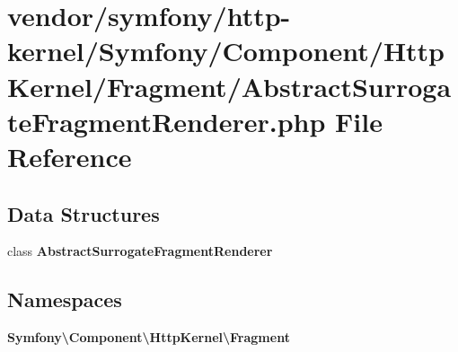 \section{vendor/symfony/http-\/kernel/\+Symfony/\+Component/\+Http\+Kernel/\+Fragment/\+Abstract\+Surrogate\+Fragment\+Renderer.php File Reference}
\label{_abstract_surrogate_fragment_renderer_8php}
\subsection*{Data Structures}
\begin{DoxyCompactItemize}
\item 
class {\bf Abstract\+Surrogate\+Fragment\+Renderer}
\end{DoxyCompactItemize}
\subsection*{Namespaces}
\begin{DoxyCompactItemize}
\item 
 {\bf Symfony\textbackslash{}\+Component\textbackslash{}\+Http\+Kernel\textbackslash{}\+Fragment}
\end{DoxyCompactItemize}
